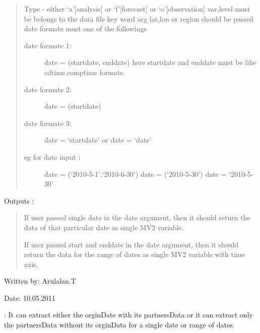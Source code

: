 \documentclass[letterpaper,10pt,english]{sphinxmanual}
\begin{document}
\begin{fulllineitems}
\begin{fulllineitems}
\begin{description}
\begin{quote}
Type - either `a'{[}analysis{]} or `f'{[}forecast{]} or `o'{[}observation{]}
var,level must be belongs to the data file
key word arg lat,lon or region should be passed
date formate must one of the followings
\begin{description}
\item[{date formate 1:}] \leavevmode
date = (startdate, enddate)
here startdate and enddate must be like cdtime.comptime formate.

\item[{date formate 2:}] \leavevmode
date = (startdate)

\item[{date formate 3:}] \leavevmode
date = `startdate' or date = `date'

\item[{eg for date input :}] \leavevmode
date = (`2010-5-1',`2010-6-30')
date = (`2010-5-30')
date = `2010-5-30'

\end{description}
\end{quote}

Outputs :
\begin{quote}

If user passed single date in the date argument, then it should
return the data of that particular date as single MV2 variable.

If user passed start and enddate in the date argument,
then it should return the data for the range of dates as
single MV2 variable with time axis.
\end{quote}

\end{description}

Written by: Arulalan.T

Date: 10.05.2011

\end{fulllineitems}


\begin{fulllineitems}
\label{diagnosisutils:xml_data_access.GribXmlAccess.getDataPartners}
{\hyperref[diagnosisutils:xml_data_access.GribXmlAccess.getDataPartners]{}}: It can extract either the orginDate with its
partnersData or it can extract only the partnersData without its
orginData for a single date or range of dates.


\end{fulllineitems}
\end{fulllineitems}
\end{document}
